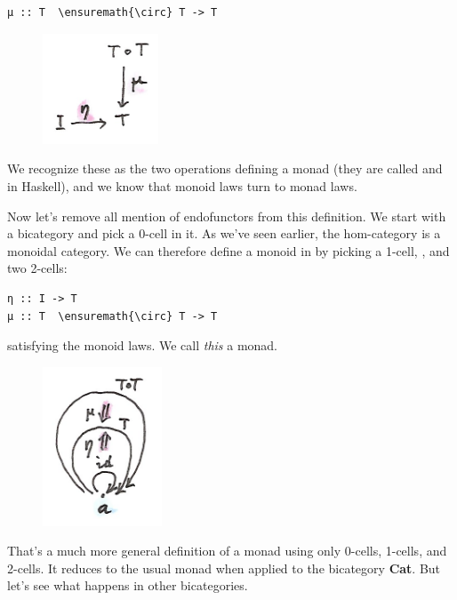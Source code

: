 \begin{Verbatim}[commandchars=\\\{\}]
μ :: T  \ensuremath{\circ} T -> T
\end{Verbatim}

\begin{figure}[H]
\centering
\includegraphics[width=1.35417in]{images/monad.png}
\end{figure}

\noindent
We recognize these as the two operations defining a monad (they are
called  and  in Haskell), and we know that
monoid laws turn to monad laws.

Now let's remove all mention of endofunctors from this definition. We
start with a bicategory  and pick a 0-cell  in it.
As we've seen earlier, the hom-category  is a monoidal
category. We can therefore define a monoid in  by
picking a 1-cell, , and two 2-cells:

\begin{Verbatim}[commandchars=\\\{\}]
η :: I -> T
μ :: T  \ensuremath{\circ} T -> T
\end{Verbatim}
satisfying the monoid laws. We call \emph{this} a monad.

\begin{figure}[H]
\centering
\includegraphics[width=1.39583in]{images/bimonad.png}
\end{figure}

\noindent
That's a much more general definition of a monad using only 0-cells,
1-cells, and 2-cells. It reduces to the usual monad when applied to the
bicategory \textbf{Cat}. But let's see what happens in other
bicategories.

